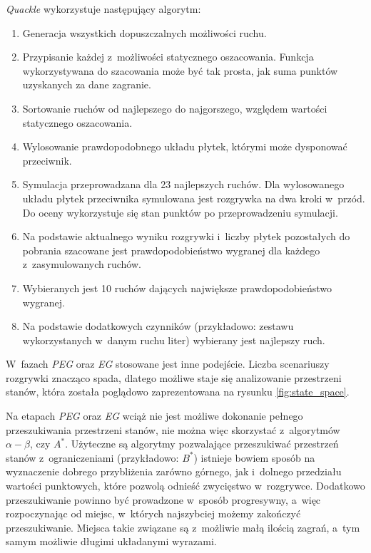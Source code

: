 \documentclass[a4paper,twocolumn,12pt]{article}
\theoremstyle{definition}
\begin{document}
\emph{Quackle} wykorzystuje następujący algorytm:

\begin{enumerate}
 \item Generacja wszystkich dopuszczalnych możliwości ruchu.
 \item Przypisanie każdej z~możliwości statycznego oszacowania. Funkcja wykorzystywana do szacowania może być tak prosta, jak suma punktów uzyskanych za dane zagranie.
 \item Sortowanie ruchów od najlepszego do najgorszego, względem wartości statycznego oszacowania.
 \item Wylosowanie prawdopodobnego układu płytek, którymi może dysponować przeciwnik.
 \item Symulacja przeprowadzana dla 23 najlepszych ruchów. Dla wylosowanego układu płytek przeciwnika symulowana jest rozgrywka na dwa kroki w~przód. Do oceny wykorzystuje się stan punktów po przeprowadzeniu symulacji.
 \item Na podstawie aktualnego wyniku rozgrywki i~liczby płytek pozostałych do pobrania szacowane jest prawdopodobieństwo wygranej dla każdego z~zasymulowanych ruchów.
 \item Wybieranych jest 10 ruchów dających największe prawdopodobieństwo wygranej.
 \item Na podstawie dodatkowych czynników (przykładowo: zestawu wykorzystanych w~danym ruchu liter) wybierany jest najlepszy ruch.
\end{enumerate}

W~fazach \emph{PEG} oraz \emph{EG} stosowane jest inne podejście. Liczba scenariuszy rozgrywki znacząco spada, dlatego możliwe staje się analizowanie przestrzeni stanów, która została poglądowo zaprezentowana na rysunku \ref{fig:state_space}. 

Na etapach \emph{PEG} oraz \emph{EG} wciąż nie jest możliwe dokonanie pełnego przeszukiwania przestrzeni stanów, nie można więc skorzystać z~algorytmów $\alpha - \beta$, czy $A^{*}$. Użyteczne są algorytmy pozwalające przeszukiwać przestrzeń stanów z~ograniczeniami (przykładowo: $B^{*}$) istnieje bowiem sposób na wyznaczenie dobrego przybliżenia zarówno górnego, jak i~dolnego przedziału wartości punktowych, które pozwolą odnieść zwycięstwo w~rozgrywce. Dodatkowo przeszukiwanie powinno być prowadzone w~sposób progresywny, a~więc rozpoczynając od miejsc, w~których najszybciej możemy zakończyć przeszukiwanie. Miejsca takie związane są z~możliwie małą ilością zagrań, a~tym samym możliwie długimi układanymi wyrazami.
\end{document}
